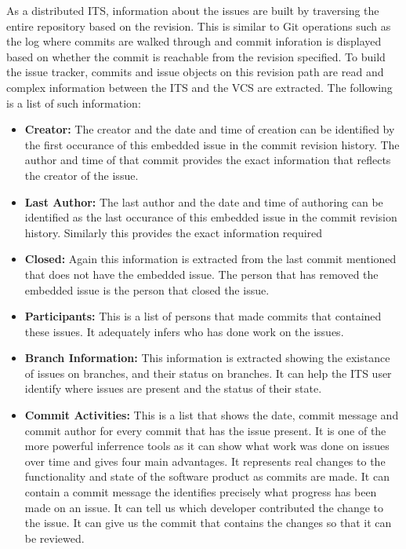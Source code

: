 \documentclass{mproj}
\begin{document}
As a distributed ITS, information about the issues are built by traversing the entire repository based on the revision. This is similar to Git operations such as the log where commits are walked through and commit inforation is displayed based on whether the commit is reachable from the revision specified. To build the issue tracker, commits and issue objects on this revision path are read and complex information between the ITS and the VCS are extracted. The following is a list of such information:

\begin{itemize}
    \item \textbf{Creator:} The creator and the date and time of creation can be identified by the first occurance of this embedded issue in the commit revision history. The author and time of that commit provides the exact information that reflects the creator of the issue.
    \item \textbf{Last Author:} The last author and the date and time of authoring can be identified as the last occurance of this embedded issue in the commit revision history. Similarly this provides the exact information required
    \item \textbf{Closed:} Again this information is extracted from the last commit mentioned that does not have the embedded issue. The person that has removed the embedded issue is the person that closed the issue.
    \item \textbf{Participants:} This is a list of persons that made commits that contained these issues. It adequately infers who has done work on the issues.
    \item \textbf{Branch Information:} This information is extracted showing the existance of issues on branches, and their status on branches. It can help the ITS user identify where issues are present and the status of their state.
    \item \textbf{Commit Activities:} This is a list that shows the date, commit message and commit author for every commit that has the issue present. It is one of the more powerful inferrence tools as it can show what work was done on issues over time and gives four main advantages. It represents real changes to the functionality and state of the software product as commits are made. It can contain a commit message the identifies precisely what progress has been made on an issue. It can tell us which developer contributed the change to the issue. It can give us the commit that contains the changes so that it can be reviewed.
\end{itemize}
\end{document}
